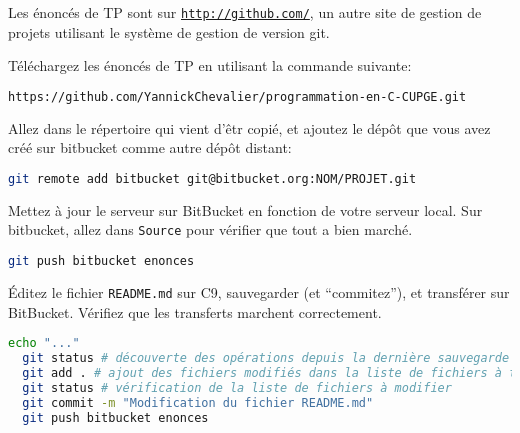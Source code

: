 
Les énoncés de TP sont sur \texttt{\url{http://github.com/}}, un autre
site de gestion de projets utilisant le système de gestion de version git.

\question Téléchargez les énoncés de TP en utilisant la commande suivante:
\begin{lstlisting}[language=bash]
  https://github.com/YannickChevalier/programmation-en-C-CUPGE.git
\end{lstlisting}


\question Allez dans le répertoire qui vient d'êtr copié, et ajoutez
le dépôt que vous avez créé sur bitbucket comme autre dépôt distant:
\begin{lstlisting}[language=bash]
  git remote add bitbucket git@bitbucket.org:NOM/PROJET.git
\end{lstlisting}


\question Mettez à jour le serveur sur BitBucket en fonction de votre
serveur local.  Sur bitbucket, allez dans \texttt{Source} pour
vérifier que tout a bien marché.
\begin{lstlisting}[language=bash]
  git push bitbucket enonces
\end{lstlisting}



\question Éditez le fichier \texttt{README.md} sur C9, sauvegarder (et
``commitez''), et transférer sur BitBucket. Vérifiez que les
transferts marchent correctement.
\begin{lstlisting}[language=bash]
  echo "..."
  git status # découverte des opérations depuis la dernière sauvegarde
  git add . # ajout des fichiers modifiés dans la liste de fichiers à transférer
  git status # vérification de la liste de fichiers à modifier
  git commit -m "Modification du fichier README.md"
  git push bitbucket enonces
\end{lstlisting}
